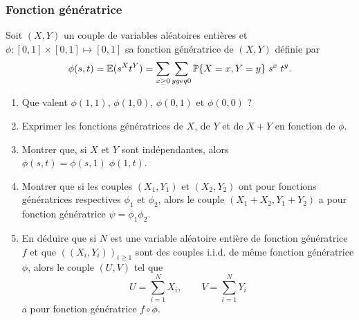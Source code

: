\subsubsection{Fonction génératrice}
  Soit $(X, Y)$ un couple de variables aléatoires entières et $\phi: [0, 1] \times [0, 1] \mapsto [0, 1]$ sa fonction génératrice de $(X, Y)$ définie par 
  $$
  \phi(s, t) = \operatorname{\mathbb{E}}(s^X t^Y) = \sum_{x \geq 0} \sum_{y geq 0} \operatorname{\mathbb{P}}\{X=x, Y=y\} \; s^x \; t^y.
  $$
  \begin{enumerate}
   \item Que valent $\phi(1, 1)$, $\phi(1, 0)$, $\phi(0, 1)$ et $\phi(0, 0)$ ?
   \item Exprimer les fonctions génératrices de $X$, de $Y$ et de $X+Y$ en fonction de $\phi$.
   \item Montrer que, si $X$ et $Y$ sont indépendantes, alors $\phi(s, t) = \phi(s, 1) \; \phi(1, t)$.
   \item Montrer que si les couples $(X_1, Y_1)$ et $(X_2, Y_2)$ ont pour fonctions génératrices respectives $\phi_1$ et $\phi_2$, alors le couple $(X_1+X_2, Y_1+Y_2)$ a pour fonction génératrice $\psi = \phi_1 \phi_2$. 
   \item En déduire que si $N$ est une variable aléatoire entière de fonction génératrice $f$ et que $((X_i, Y_i))_{i \geq 1}$ sont des couples i.i.d. de même fonction génératrice $\phi$, alors le couple $(U, V)$ tel que
   $$
   U = \sum_{i=1}^N X_i, \qquad V = \sum_{i=1}^N Y_i
   $$
   a pour fonction génératrice $f \circ \phi$.
  \end{enumerate}

\solution{\todo{}}

